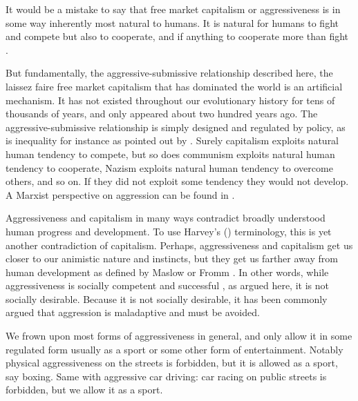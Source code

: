 \documentclass[11pt, letterpaper]{article}
\begin{document}
\begin{spacing}{2.0}
It would be a mistake to say that free market capitalism or aggressiveness
is in some way inherently most natural to humans. It is natural for humans to fight and
compete but also to cooperate, and if anything to cooperate more than fight
\citep{bowles11}.

But fundamentally, the aggressive-submissive relationship described here, the
laissez faire free market capitalism that has dominated the world is an
artificial mechanism. It has not existed throughout  our evolutionary history for
tens of thousands of years, and only appeared about two hundred years ago.
 The aggressive-submissive relationship  is simply designed
and regulated by policy, as is inequality for instance as pointed out by
\citep{fischer96}. Surely capitalism exploits  natural human tendency to
compete, but so does communism exploits natural human tendency to cooperate,
Nazism exploits natural human tendency to overcome others, and so on. If they
did not exploit some tendency they would not develop. %
 A Marxist perspective on aggression can be found in \citet{reed70}.

Aggressiveness and capitalism in many ways contradict  broadly understood human
progress and development. To use Harvey's (\citeyear{harvey14}) terminology,
this is yet another contradiction of capitalism. %
 Perhaps,
aggressiveness and capitalism get us closer to our animistic nature and
instincts, but they get us farther away from human development as  defined by
Maslow or Fromm \citep{maslow13,fromm92,fromm64,fromm94}. In other words, while
aggressiveness is socially competent and successful \citep{little13}, as argued here, it is not
socially desirable. Because it is not socially desirable, it has been commonly
argued that aggression is maladaptive and must be avoided. %

We frown upon most forms of aggressiveness in general, and only allow it in some
regulated form usually as a sport or some other form of entertainment. Notably
physical aggressiveness on the streets is forbidden, but it is allowed as a
sport, say boxing.  Same with
aggressive car driving: car racing on public streets is forbidden, but we
allow it as a sport.


\end{spacing}
\end{document}
